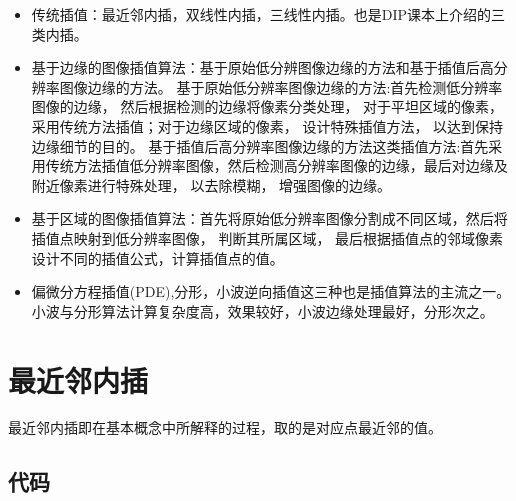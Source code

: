 \documentclass{article}
\begin{document}
\begin{itemize}

\item 传统插值：最近邻内插，双线性内插，三线性内插。也是DIP课本上介绍的三类内插。
\item 基于边缘的图像插值算法：基于原始低分辨图像边缘的方法和基于插值后高分辨率图像边缘的方法。
基于原始低分辨率图像边缘的方法:首先检测低分辨率图像的边缘， 然后根据检测的边缘将像素分类处理， 对于平坦区域的像素，采用传统方法插值；对于边缘区域的像素， 设计特殊插值方法， 以达到保持边缘细节的目的。
基于插值后高分辨率图像边缘的方法这类插值方法:首先采用传统方法插值低分辨率图像，然后检测高分辨率图像的边缘，最后对边缘及附近像素进行特殊处理， 以去除模糊， 增强图像的边缘。
\item 基于区域的图像插值算法：首先将原始低分辨率图像分割成不同区域，然后将插值点映射到低分辨率图像， 判断其所属区域， 最后根据插值点的邻域像素设计不同的插值公式，计算插值点的值。
\item 偏微分方程插值(PDE),分形，小波逆向插值这三种也是插值算法的主流之一。小波与分形算法计算复杂度高，效果较好，小波边缘处理最好，分形次之。

\end{itemize}
\newpage

\section{最近邻内插}

最近邻内插即在基本概念中所解释的过程，取的是对应点最近邻的值。

\subsection{代码}
\end{document}

